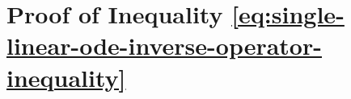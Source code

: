 \documentclass[accepted]{uai2023}
\newcommand{\I}{\mathcal{I}}
\begin{document}



\section{Proof of Inequality \ref{eq:single-linear-ode-inverse-operator-inequality}} \label{appendix:inequality-proof-inverse-operator-chain}
\end{document}
